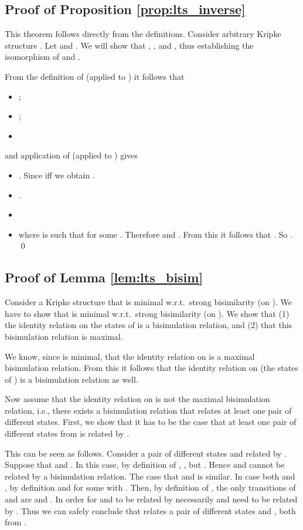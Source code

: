 \documentclass{llncs}
\begin{document}
\subsection{Proof of Proposition \ref{prop:lts_inverse}}
\label{pf:prop:lts_inverse}

This theorem follows directly from the definitions.
Consider arbitrary Kripke structure . Let  and . We will show that , ,  and , thus establishing the isomorphism of  and .

From the definition of  (applied to ) it follows that
\begin{itemize}
\item ;
\item ;
\item 
\end{itemize}
and application of  (applied to ) gives
\begin{itemize}
\item . Since  iff  we obtain
    .
\item .
\item 
\item  where  is such that  for some . Therefore  and . From this it follows that . So . \qed
\end{itemize}


\subsection{Proof of Lemma \ref{lem:lts_bisim}}
\label{pf:lem:lts_bisim}

Consider a Kripke structure  that is minimal w.r.t.\ strong bisimilarity (on \KS). We have to show that  is minimal w.r.t.\ strong bisimilarity (on \LTS). We show that (1) the identity relation on the states of  is a bisimulation relation, and (2) that this bisimulation relation is maximal.

We know, since  is minimal, that the identity relation on  is a maximal bisimulation relation. From this it follows that the identity relation on  (the states of ) is a bisimulation relation as well.

Now assume that the identity relation on  is not the maximal bisimulation relation, i.e.,  there exists a bisimulation relation  that relates at least one pair of different states. First, we show that it has to be the case that at least one pair of different states from  is related by .

This can be seen as follows. Consider a pair of different states  and  related by . Suppose that  and . In this case, by definition of , , but . Hence  and  cannot be related by a bisimulation relation. The case that  and  is similar.
In case both  and , by definition  and  for some  with . Then, by definition of , the only transitions of  and  are  and . In order for  and  to be related by  necessarily  and  need to be related by . Thus we can safely conclude that  relates a pair of different states  and , both from .
\end{document}
